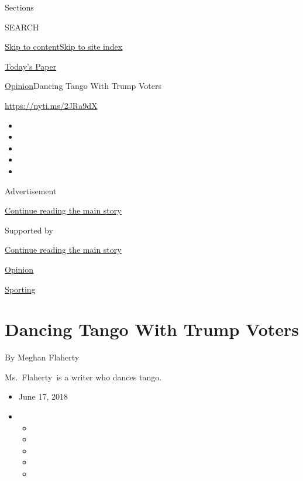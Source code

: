 Sections

SEARCH

\protect\hyperlink{site-content}{Skip to
content}\protect\hyperlink{site-index}{Skip to site index}

\href{https://myaccount.nytimes3xbfgragh.onion/auth/login?response_type=cookie\&client_id=vi}{}

\href{https://www.nytimes3xbfgragh.onion/section/todayspaper}{Today's
Paper}

\href{/section/opinion}{Opinion}\textbar{}Dancing Tango With Trump
Voters

\url{https://nyti.ms/2JRa9dX}

\begin{itemize}
\item
\item
\item
\item
\item
\end{itemize}

Advertisement

\protect\hyperlink{after-top}{Continue reading the main story}

Supported by

\protect\hyperlink{after-sponsor}{Continue reading the main story}

\href{/section/opinion}{Opinion}

\href{/column/sporting}{Sporting}

\hypertarget{dancing-tango-with-trump-voters}{%
\section{Dancing Tango With Trump
Voters}\label{dancing-tango-with-trump-voters}}

By Meghan Flaherty

Ms.~Flaherty~is a writer who dances tango.

\begin{itemize}
\item
  June 17, 2018
\item
  \begin{itemize}
  \item
  \item
  \item
  \item
  \item
  \end{itemize}
\end{itemize}

